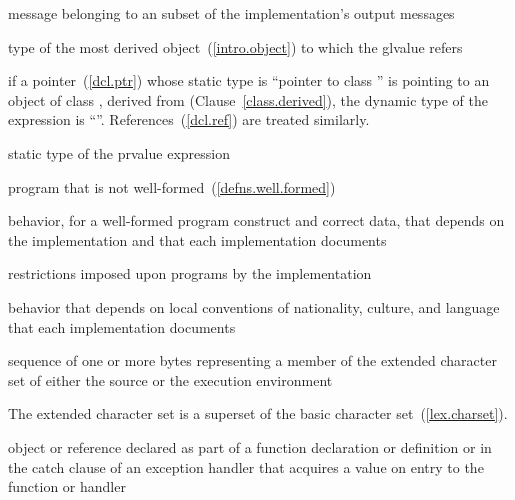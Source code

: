 %
message belonging to an  subset of the
implementation's output messages

%
 type of the most derived object~(\ref{intro.object}) to which the
glvalue refers\\
\begin{example}
if a pointer~(\ref{dcl.ptr})  whose static type is ``pointer to
class '' is pointing to an object of class , derived
from  (Clause~\ref{class.derived}), the dynamic type of the
expression  is ``''. References~(\ref{dcl.ref}) are
treated similarly.
\end{example}

%
 static type of the prvalue expression

%
program that is not well-formed~(\ref{defns.well.formed})

%
behavior, for a well-formed program construct and correct data, that
depends on the implementation and that each implementation documents

%
restrictions imposed upon programs by the implementation

%
behavior that depends on local conventions of nationality, culture, and
language that each implementation documents

%
sequence of one or more bytes representing a member of the extended
character set of either the source or the execution environment\\
\begin{note} The
extended character set is a superset of the basic character
set~(\ref{lex.charset}).\end{note}

%
%
%
 object or reference declared as part of a function declaration or
definition or in the catch clause of an exception handler that
acquires a value on entry to the function or handler

